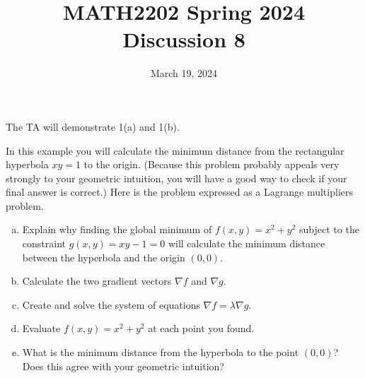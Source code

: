 \documentclass[11pt,oneside]{amsart}
\title{MATH2202 Spring 2024\\
Discussion 8}
\date{March 19, 2024}
\theoremstyle{definition}
\begin{document}
  \maketitle

  The TA will demonstrate 1(a) and 1(b).

  \begin{problem}
    In this example you will calculate the minimum distance from the rectangular hyperbola $xy=1$ to the origin. (Because this problem probably appeals very strongly to your geometric intuition, you will have a good way to check if your final answer is correct.) Here is the problem expressed as a Lagrange multipliers problem.
    \begin{enumerate}[(a)]
      \item Explain why finding the global minimum of $f(x,y)=x^2+y^2$ subject to the constraint $g(x,y)=xy-1=0$ will calculate the minimum distance between the hyperbola and the origin $(0,0)$.
      \item Calculate the two gradient vectors $\nabla f$ and $\nabla g$.
      \item Create and solve the system of equations $\nabla f=\lambda\nabla g$.
      \item Evaluate $f(x,y)=x^2+y^2$ at each point you found.
      \item What is the minimum distance from the hyperbola to the point $(0,0)$? Does this agree with your geometric intuition?
    \end{enumerate}
  \end{problem}
\end{document}
